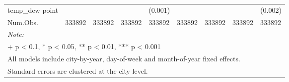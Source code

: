 \begin{landscape}
\begin{table}
{\begin{tabular}[t]{lllllllll}
\multirow{-2}{*}{\raggedright\arraybackslash temp_{dew point}} &  &  &  & (0.001) &  &  &  & (0.002)\\

Num.Obs. & 333892 & 333892 & 333892 & 333892 & 333892 & 333892 & 333892 & 333892\\
\bottomrule
\multicolumn{9}{l}{\rule{0pt}{1em}\textit{Note: }}\\
\multicolumn{9}{l}{\rule{0pt}{1em}+ p < 0.1, * p < 0.05, ** p < 0.01, *** p < 0.001}\\
\multicolumn{9}{l}{\rule{0pt}{1em}All models include city-by-year, day-of-week and month-of-year fixed effects.}\\
\multicolumn{9}{l}{\rule{0pt}{1em}Standard errors are clustered at the city level.}\\
\end{tabular}}
\end{table}
\end{landscape}
